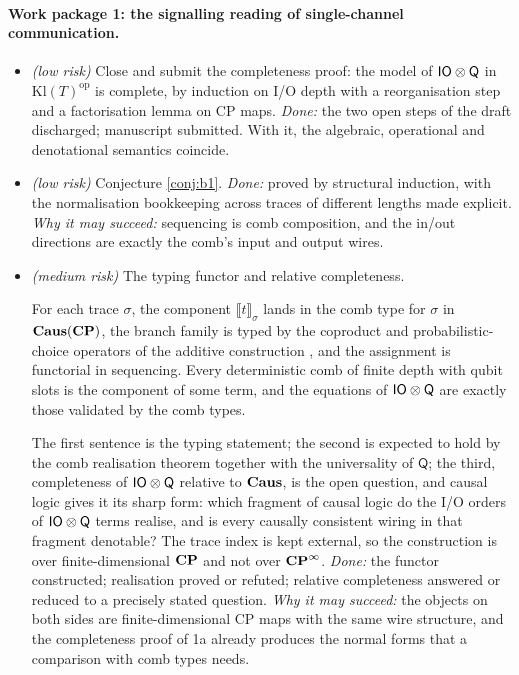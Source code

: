 \paragraph{Work package 1: the signalling reading of single-channel communication.}
\begin{itemize}[nosep]
\item[1a] \textit{(low risk)} Close and submit the completeness proof: the model of $\mathsf{IO}\otimes\mathsf{Q}$ in $\mathrm{Kl}(T)^{\mathrm{op}}$ is complete, by induction on I/O depth with a reorganisation step and a factorisation lemma on CP maps. \emph{Done:} the two open steps of the draft discharged; manuscript submitted. With it, the algebraic, operational and denotational semantics coincide.
\item[1b] \textit{(low risk)} Conjecture \ref{conj:b1}. \emph{Done:} proved by structural induction, with the normalisation bookkeeping across traces of different lengths made explicit. \emph{Why it may succeed:} sequencing is comb composition, and the in/out directions are exactly the comb's input and output wires.
\item[1c] \textit{(medium risk)} The typing functor and relative completeness.
\begin{conj}\label{conj:b2}
For each trace $\sigma$, the component $\llbracket t\rrbracket_\sigma$ lands in the comb type for $\sigma$ in $\mathbf{Caus}(\mathbf{CP})$, the branch family is typed by the coproduct and probabilistic-choice operators of the additive construction \cite{simmons2024thesis}, and the assignment is functorial in sequencing. Every deterministic comb of finite depth with qubit slots is the component of some term, and the equations of $\mathsf{IO}\otimes\mathsf{Q}$ are exactly those validated by the comb types.
\end{conj}
\noindent The first sentence is the typing statement; the second is expected to hold by the comb realisation theorem \cite{chiribella2009networks} together with the universality of $\mathsf{Q}$; the third, completeness of $\mathsf{IO}\otimes\mathsf{Q}$ relative to $\mathbf{Caus}$, is the open question, and causal logic \cite{simmons2024thesis,simmons2024completelogic} gives it its sharp form: which fragment of causal logic do the I/O orders of $\mathsf{IO}\otimes\mathsf{Q}$ terms realise, and is every causally consistent wiring in that fragment denotable? The trace index is kept external, so the construction is over finite-dimensional $\mathbf{CP}$ and not over $\mathbf{CP}^{\infty}$. \emph{Done:} the functor constructed; realisation proved or refuted; relative completeness answered or reduced to a precisely stated question. \emph{Why it may succeed:} the objects on both sides are finite-dimensional CP maps with the same wire structure, and the completeness proof of 1a already produces the normal forms that a comparison with comb types needs.

\end{itemize}
